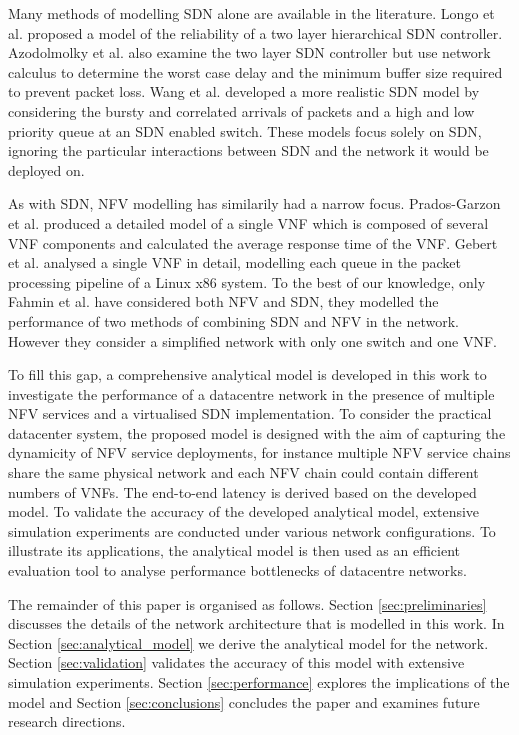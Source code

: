 Many methods of modelling SDN alone are available in the literature. Longo et al. \cite{LongoDBS15} proposed a model of the reliability of a two layer hierarchical SDN controller. Azodolmolky et al. \cite{AzodolmolkyWY13} also examine the two layer SDN controller but use network calculus to determine the worst case delay and the minimum buffer size required to prevent packet loss. Wang et al. \cite{MiaoMWWH16} developed a more realistic SDN model by considering the bursty and correlated arrivals of packets and a high and low priority queue at an SDN enabled switch. These models focus solely on SDN, ignoring the particular interactions between SDN and the network it would be deployed on.

As with SDN, NFV modelling has similarily had a narrow focus. Prados-Garzon et al. \cite{Prados-GarzonAR17} produced a detailed model of a single VNF which is composed of several VNF components and calculated the average response time of the VNF. Gebert et al. \cite{GebertZLST16} analysed a single VNF in detail, modelling each queue in the packet processing pipeline of a Linux x86 system. To the best of our knowledge, only Fahmin et al. \cite{FahminLHLS17} have considered both NFV and SDN, they modelled the performance of two methods of combining SDN and NFV in the network. However they consider a simplified network with only one switch and one VNF.

To fill this gap, a comprehensive analytical model is developed in this work to investigate the performance of a datacentre network in the presence of multiple NFV services and a virtualised SDN implementation. To consider the practical datacenter system, the proposed model is designed with the aim of capturing the dynamicity of NFV service deployments, for instance multiple NFV service chains share the same physical network and each NFV chain could contain different numbers of VNFs. The end-to-end latency is derived based on the developed model. To validate the accuracy of the developed analytical model, extensive simulation experiments are conducted under various network configurations. To illustrate its applications, the analytical model is then used as an efficient evaluation tool to analyse performance bottlenecks of datacentre networks. 

The remainder of this paper is organised as follows. Section \ref{sec:preliminaries} discusses the details of the network architecture that is modelled in this work. In Section \ref{sec:analytical_model} we derive the analytical model for the network. Section \ref{sec:validation} validates the accuracy of this model with extensive simulation experiments. Section \ref{sec:performance} explores the implications of the model and Section \ref{sec:conclusions} concludes the paper and examines future research directions. 